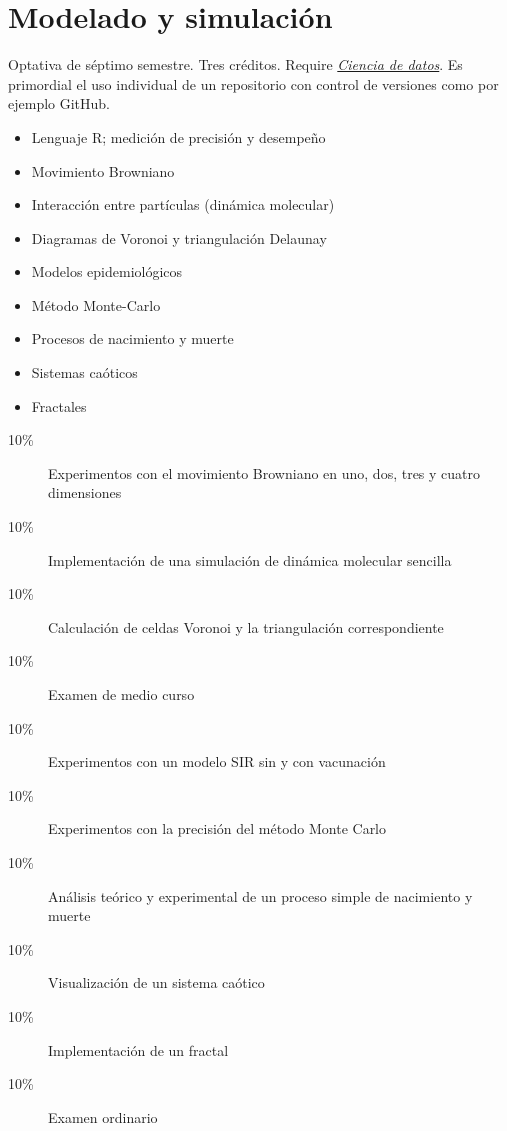 \documentclass{article}
\begin{document}
\begin{multicols}{4}
\hypertarget{mys}{\section*{Modelado y simulaci\'{o}n}}

Optativa de s\'{e}ptimo semestre. Tres cr\'{e}ditos. Require
\hyperlink{cdd}{\em Ciencia de datos}. Es primordial el uso individual
de un repositorio con control de versiones como por ejemplo GitHub.

\begin{itemize}
\item{Lenguaje R; medici\'{o}n de precisi\'{o}n y desempe\~{n}o}
\item{Movimiento Browniano}
\item{Interacci\'{o}n entre part\'{i}culas (din\'{a}mica molecular)}  
\item{Diagramas de Voronoi y triangulaci\'{o}n Delaunay}  
\item{Modelos epidemiol\'{o}gicos}
\item{M\'{e}todo Monte-Carlo}
\item{Procesos de nacimiento y muerte}
\item{Sistemas ca\'{o}ticos}
\item{Fractales}
\end{itemize}

\begin{description}
\item[10\%]{Experimentos con el movimiento Browniano en uno, dos, tres
  y cuatro dimensiones}
\item[10\%]{Implementaci\'{o}n de una simulaci\'{o}n de din\'{a}mica molecular
  sencilla}
\item[10\%]{Calculaci\'{o}n de celdas Voronoi y la triangulaci\'{o}n correspondiente}
\item[10\%]{Examen de medio curso}
\item[10\%]{Experimentos con un modelo SIR sin y con vacunaci\'{o}n}
\item[10\%]{Experimentos con la precisi\'{o}n del m\'{e}todo Monte Carlo}
\item[10\%]{An\'{a}lisis te\'{o}rico y experimental de un proceso simple de nacimiento y muerte}
\item[10\%]{Visualizaci\'{o}n de un sistema ca\'{o}tico}
\item[10\%]{Implementaci\'{o}n de un fractal}  
\item[10\%]{Examen ordinario}
\end{description}  


\end{multicols}
\end{document}
